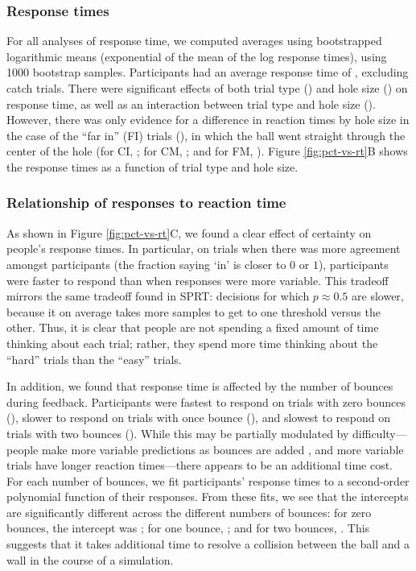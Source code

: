 \documentclass[10pt,letterpaper]{article}
\begin{document}
\subsubsection{Response times}

For all analyses of response time, we computed averages using bootstrapped logarithmic means (exponential of the mean of the log response times), using 1000 bootstrap samples.
Participants had an average response time of \AvgRT{}, excluding catch trials.
There were significant effects of both trial type (\RTHoleClass{}) and hole size (\RTHoleSize{}) on response time, as well as an interaction between trial type and hole size (\RTFull{}).
However, there was only evidence for a difference in reaction times by hole size in the case of the ``far in'' (FI) trials (\ResponsetimeFIttest{}), in which the ball went straight through the center of the hole (for CI, \ResponsetimeCIttest{}; for CM, \ResponsetimeCMttest{}; and for FM, \ResponsetimeFMttest{}).
Figure \ref{fig:pct-vs-rt}B shows the response times as a function of trial type and hole size.

\subsubsection{Relationship of responses to reaction time}

As shown in Figure \ref{fig:pct-vs-rt}C, we found a clear effect of certainty on people's response times.
In particular, on trials when there was more agreement amongst participants (the fraction saying `in' is closer to $0$ or $1$), participants were faster to respond than when responses were more variable.
This tradeoff mirrors the same tradeoff found in SPRT: decisions for which $p\approx0.5$ are slower, because it on average takes more samples to get to one threshold versus the other.
Thus, it is clear that people are not spending a fixed amount of time thinking about each trial; rather, they spend more time thinking about the ``hard'' trials than the ``easy'' trials.

In addition, we found that response time is affected by the number of bounces during feedback.
Participants were fastest to respond on trials with zero bounces (\RTZeroBounces{}), slower to respond on trials with once bounce (\RTOneBounces{}), and slowest to respond on trials with two bounces (\RTTwoBounces{}).
While this may be partially modulated by difficulty---people make more variable predictions as bounces are added \cite{Smith:2013fc}, and more variable trials have longer reaction times---there appears to be an additional time cost.
For each number of bounces, we fit participants' response times to a second-order polynomial function of their responses.
From these fits, we see that the intercepts are significantly different across the different numbers of bounces: for zero bounces, the intercept was \InterceptZeroBounces{}; for one bounce, \InterceptOneBounces{}; and for two bounces, \InterceptTwoBounces{}.
This suggests that it takes additional time to resolve a collision between the ball and a wall in the course of a simulation.
\end{document}
